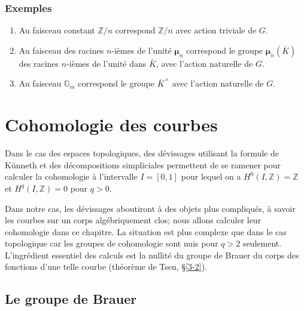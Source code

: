 \documentclass{article}
\newcommand{\dG}{\mathbb{G}}
\newcommand{\dmu}{\boldsymbol{\mu}}
\newcommand{\dZ}{\mathbb{Z}}
\begin{document}
\subsubsection{Exemples}\label{2-4-5}

\begin{enumerate}[\indent a)]
  \item Au faisceau constant $\dZ/n$ correspond $\dZ/n$ avec action triviale de 
    $G$. 
  \item Au faisceau des racines $n$-ièmes de l'unité $\dmu_n$ correspond 
    le groupe $\dmu_n(\bar K)$ des racines $n$-ièmes de l'unité dans 
    $\bar K$, avec l'action naturelle de $G$.
  \item Au faisceau $\dG_m$ correspond le groupe $\bar K^\times$ avec l'action 
    naturelle de $G$.
\end{enumerate}




















\section{Cohomologie des courbes}\label{3}

Dans le cas des espaces topologiques, des dévissages utilisant la formule de 
K\"unneth et des décompositions simpliciales permettent de se ramener pour 
calculer la cohomologie à l'intervalle $I=[0,1]$ pour lequel on a 
$H^0(I,\dZ)=\dZ$ et $H^q(I,\dZ)=0$ pour $q>0$. 

Dans notre cas, les dévissages aboutiront à des objets plus compliqués, 
à savoir les courbes sur un corps algébriquement clos; nous allons calculer 
leur cohomologie dans ce chapitre. La situation est plus complexe que dans le 
cas topologique car les groupes de cohomologie sont nuis pour $q>2$ seulement. 
L'ingrédient essentiel des calculs est la nullité du groupe de Brauer du 
corps des fonctions d'une telle courbe (théorème de Tsen, \S\ref{3-2}). 










\subsection{Le groupe de Brauer}\label{3-1}
\end{document}
